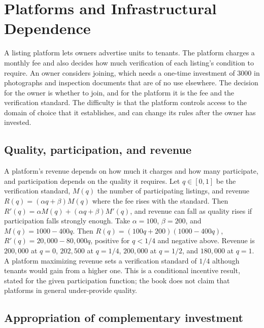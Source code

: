 \chapter{Platforms and Infrastructural Dependence}\label{ch:33}

A listing platform lets owners advertise units to tenants. The platform charges a monthly fee and also decides how much verification of each listing's condition to require. An owner considers joining, which needs a one-time investment of $3000$ in photographs and inspection documents that are of no use elsewhere. The decision for the owner is whether to join, and for the platform it is the fee and the verification standard. The difficulty is that the platform controls access to the domain of choice that it establishes, and can change its rules after the owner has invested.

\section{Quality, participation, and revenue}

A platform's revenue depends on how much it charges and how many participate, and participation depends on the quality it requires. Let $q\in[0,1]$ be the verification standard, $M(q)$ the number of participating listings, and revenue $R(q)=(\alpha q+\beta)M(q)$ where the fee rises with the standard. Then $R'(q)=\alpha M(q)+(\alpha q+\beta)M'(q)$, and revenue can fall as quality rises if participation falls strongly enough. Take $\alpha=100$, $\beta=200$, and $M(q)=1000-400q$. Then $R(q)=(100q+200)(1000-400q)$, $R'(q)=20{,}000-80{,}000q$, positive for $q<1/4$ and negative above. Revenue is $200{,}000$ at $q=0$, $202{,}500$ at $q=1/4$, $200{,}000$ at $q=1/2$, and $180{,}000$ at $q=1$. A platform maximizing revenue sets a verification standard of $1/4$ although tenants would gain from a higher one. This is a conditional incentive result, stated for the given participation function; the book does not claim that platforms in general under-provide quality.

\section{Appropriation of complementary investment}

